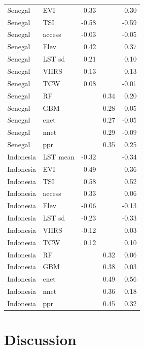 \documentclass[11pt]{article}
\begin{document}
\begin{table}
\begin{tabular}{ll|rrr}
Senegal & EVI &  0.33&  & 0.30\\
Senegal & TSI &  -0.58&  &  -0.59\\
Senegal & access & -0.03 &  &  -0.05\\
Senegal & Elev &  0.42&  &0.37\\ 
Senegal & LST sd &  0.21&  & 0.10 \\
Senegal & VIIRS &  0.13&  &  0.13\\
Senegal & TCW & 0.08 &  &-0.01\\ 
Senegal & RF &  & 0.34 &  0.20\\
Senegal & GBM &  &  0.28& 0.05\\
Senegal & enet &  &  0.27&  -0.05\\
Senegal & nnet &  & 0.29 &-0.09 \\
Senegal & ppr &  &  0.35& 0.25\vspace{0.2cm}\\
Indonesia & LST mean & -0.32 &  &-0.34\\
Indonesia & EVI &  0.49&  & 0.36\\
Indonesia & TSI &  0.58&  &0.52\\
Indonesia & access &0.33 &  & 0.06 \\
Indonesia & Elev& -0.06&  &-0.13\\ 
Indonesia & LST sd & -0.23 &  & -0.33\\
Indonesia & VIIRS &  -0.12&  & 0.03\\
Indonesia & TCW& 0.12 &  &0.10\\ 
Indonesia & RF &  & 0.32 & 0.06\\
Indonesia & GBM &  &  0.38&0.03\\
Indonesia & enet &  &  0.49&  0.56\\
Indonesia & nnet &  &  0.36&  0.18\\
Indonesia & ppr &  &  0.45& 0.32\\



\end{tabular}
\label{t:mlresults}
\end{table}



\section{Discussion}
\end{document}
